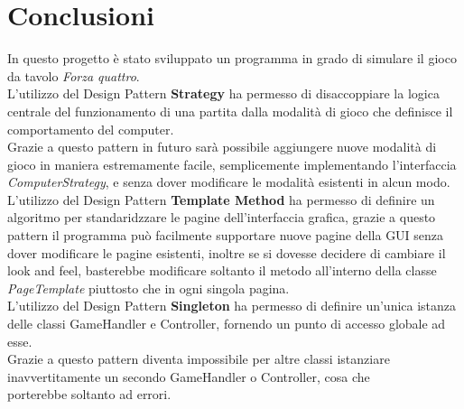 
\thispagestyle{headings}
\newpage
\section{Conclusioni}\label{sec:conclusioni}

In questo progetto è stato sviluppato un programma in grado di simulare il gioco da tavolo \textit{Forza quattro}. \\
L'utilizzo del Design Pattern \textbf{Strategy} ha permesso di disaccoppiare la logica centrale del funzionamento
di una partita dalla modalità di gioco che definisce il comportamento del computer. \\
Grazie a questo pattern in futuro sarà possibile aggiungere nuove modalità di gioco in maniera estremamente facile,
semplicemente implementando l'interfaccia \textit{ComputerStrategy}, e senza dover modificare le modalità esistenti
in alcun modo.
\\
L'utilizzo del Design Pattern \textbf{Template Method} ha permesso di definire un algoritmo per standaridzzare le pagine
dell'interfaccia grafica, grazie a questo pattern il programma può facilmente supportare nuove pagine della GUI senza
dover modificare le pagine esistenti, inoltre se si dovesse decidere di cambiare il look and feel, basterebbe modificare
soltanto il metodo all'interno della classe \textit{PageTemplate} piuttosto che in ogni singola pagina.
\\
L'utilizzo del Design Pattern \textbf{Singleton} ha permesso di definire un'unica istanza delle classi GameHandler e
Controller, fornendo un punto di accesso globale ad esse. \\
Grazie a questo pattern diventa impossibile per altre classi istanziare inavvertitamente un secondo GameHandler o
Controller, cosa che \\porterebbe soltanto ad errori. \\